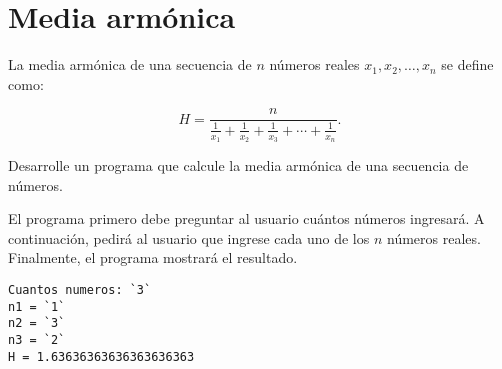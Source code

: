 \section{Media armónica}

La media armónica de una secuencia de \(n\) números reales
\(x_1, x_2, \ldots, x_n\) se define como:

\[H = \frac{n}{\frac{1}{x_1} + \frac{1}{x_2} + \frac{1}{x_3} + \cdots + \frac{1}{x_n}}.\]

Desarrolle un programa que calcule la media armónica de una secuencia de
números.

El programa primero debe preguntar al usuario cuántos números ingresará.
A continuación, pedirá al usuario que ingrese cada uno de los \(n\)
números reales. Finalmente, el programa mostrará el resultado.

\begin{lstlisting}[language=testcase]
Cuantos numeros: `3`
n1 = `1`
n2 = `3`
n3 = `2`
H = 1.63636363636363636363
\end{lstlisting}
